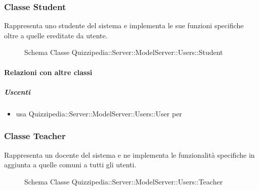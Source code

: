 \subsubsection{Classe Student}
Rappresenta uno studente del sistema e implementa le sue funzioni specifiche oltre a quelle ereditate da utente.
\begin{figure}[H]
\centering
\noindent{}
\caption[Schema Classe Student]{Schema Classe Quizzipedia::Server::ModelServer::Users::Student}
\end{figure}
\paragraph{Relazioni con altre classi}
\subparagraph{Uscenti}
\begin{itemize}
\item usa Quizzipedia::Server::ModelServer::Users::User per 
\end{itemize}
\subsubsection{Classe Teacher}
Rappresenta un docente del sistema e ne implementa le funzionalità specifiche in aggiunta a quelle comuni a tutti gli utenti.
\begin{figure}[H]
\centering
\noindent{}
\caption[Schema Classe Teacher]{Schema Classe Quizzipedia::Server::ModelServer::Users::Teacher}
\end{figure}
